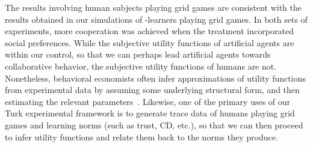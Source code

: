 The results involving human subjects playing grid games are consistent
with the results obtained in our simulations of \Q-learners playing
grid games.  In both sets of experiments, more cooperation was
achieved when the treatment incorporated social preferences.  While
the subjective utility functions of artificial agents are within our
control, so that we can perhaps lead artificial agents towards
collaborative behavior, the subjective utility functions of humans are
not.  Nonetheless, behavioral economists often infer approximations of
utility functions from experimental data by assuming some underlying
structural form, and then estimating the relevant
parameters~\cite{blanco11,fisman07}.  Likewise, one of the primary
uses of our Turk experimental framework is to generate trace data of
humans playing grid games and learning norms (such as trust, CD,
etc.), so that we can then proceed to infer utility functions and
relate them back to the norms they produce.

%
%
